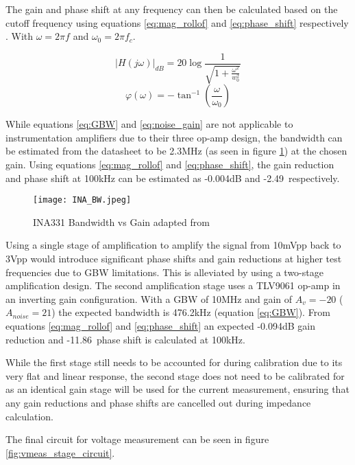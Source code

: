 The gain and phase shift at any frequency can then be calculated based on the cutoff frequency using equations \ref{eq:mag_rollof} and \ref{eq:phase_shift} respectively \cite{oljacaOperationalAmplifierGain2010}. With $\omega=2\pi f$ and $\omega_0=2\pi f_c$.

\begin{equation}
    |H(j\omega)|_{dB} = 20\log\frac{1}{\sqrt{1+\frac{\omega^2}{w_0^2}}}
    \label{eq:mag_rollof}
\end{equation}
\begin{equation}
    \varphi(\omega) = -\tan^{-1}(\frac{\omega}{\omega_0})
    \label{eq:phase_shift}
\end{equation}

While equations \ref{eq:GBW} and \ref{eq:noise_gain} are not applicable to instrumentation amplifiers due to their three op-amp design, the bandwidth can be estimated from the datasheet to be 2.3MHz (as seen in figure \ref{fig:ina_bw}) at the chosen gain. Using equations \ref{eq:mag_rollof} and \ref{eq:phase_shift}, the gain reduction and phase shift at 100kHz can be estimated as -0.004dB and -2.49\textdegree\ respectively. 

\begin{figure}[H]
    \centering
    \texttt{[image: INA\_BW.jpeg]}
    \caption{INA331 Bandwidth vs Gain adapted from \cite{INA331}}
    \label{fig:ina_bw}
\end{figure}

Using a single stage of amplification to amplify the signal from 10mVpp back to 3Vpp would introduce significant phase shifts and gain reductions at higher test frequencies due to \ac{GBW} limitations. This is alleviated by using a two-stage amplification design. The second amplification stage uses a TLV9061 op-amp in an inverting gain configuration. With a GBW of 10MHz and gain of $A_v=-20$ ($A_{noise}=21$) the expected bandwidth is 476.2kHz (equation \ref{eq:GBW}). From equations \ref{eq:mag_rollof} and \ref{eq:phase_shift} an expected -0.094dB gain reduction and -11.86\textdegree\ phase shift is calculated at 100kHz. 

While the first stage still needs to be accounted for during calibration due to its very flat and linear response, the second stage does not need to be calibrated for as an identical gain stage will be used for the current measurement, ensuring that any gain reductions and phase shifts are cancelled out during impedance calculation.

The final circuit for voltage measurement can be seen in figure \ref{fig:vmeas_stage_circuit}.

